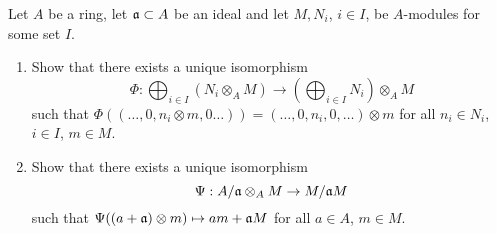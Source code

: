 \documentclass[a4paper,11pt]{article}
\begin{document}
Let $A$ be a ring, let $\mathfrak{a} \subset A$ be an ideal and let $M, N_i$, $i \in I$, be $A$-modules for some set $I$. 
\begin{enumerate}
    \item Show that there exists a unique isomorphism
        \begin{equation*}
            \Phi: \bigoplus_{i \in I} (N_i \otimes_A M) \to \left( \bigoplus_{i
                \in I} N_i \right ) \otimes_A M
        \end{equation*}
        such that $\Phi((\dots,0, n_i \otimes m, 0 \dots)) = (\dots, 0, n_i, 0,\dots) \otimes m$ for all $n_i \in N_i$, $i \in I$, $m \in M$. 
    \item Show that there exists a unique isomorphism
        \begin{equation*}
            \Psi: A / \mathfrak{a} \otimes_A M \to M/\mathfrak{a} M
        \end{equation*}
        such that $\Psi((a + \mathfrak{a}) \otimes m) \mapsto am + \mathfrak{a} M$ for all 
        $a \in A$, $m \in M$. 
\end{enumerate}
\end{document}
